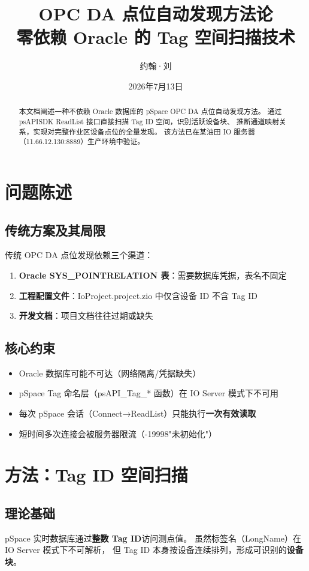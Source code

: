 \documentclass[12pt,a4paper]{ctexart}
\title{\textbf{OPC DA 点位自动发现方法论\\零依赖 Oracle 的 Tag 空间扫描技术}}
\author{约翰·刘}
\date{2026年7月13日}
\begin{document}
\maketitle
\begin{abstract}
本文档阐述一种不依赖 Oracle 数据库的 pSpace OPC DA 点位自动发现方法。
通过 psAPISDK ReadList 接口直接扫描 Tag ID 空间，识别活跃设备块、
推断通道映射关系，实现对完整作业区设备点位的全量发现。
该方法已在某油田 IO 服务器（11.66.12.130:8889）生产环境中验证。
\end{abstract}

\section{问题陈述}

\subsection{传统方案及其局限}
传统 OPC DA 点位发现依赖三个渠道：
\begin{enumerate}[leftmargin=*]
  \item \textbf{Oracle SYS\_POINTRELATION 表}：需要数据库凭据，表名不固定
  \item \textbf{工程配置文件}：IoProject.project.zio 中仅含设备 ID 不含 Tag ID
  \item \textbf{开发文档}：项目文档往往过期或缺失
\end{enumerate}

\subsection{核心约束}
\begin{itemize}[leftmargin=*]
  \item Oracle 数据库可能不可达（网络隔离/凭据缺失）
  \item pSpace Tag 命名层（psAPI\_Tag\_* 函数）在 IO Server 模式下不可用
  \item 每次 pSpace 会话（Connect→ReadList）只能执行\textbf{一次有效读取}
  \item 短时间多次连接会被服务器限流（-19998"未初始化"）
\end{itemize}

\section{方法：Tag ID 空间扫描}

\subsection{理论基础}
pSpace 实时数据库通过\textbf{整数 Tag ID}访问测点值。
虽然标签名（LongName）在 IO Server 模式下不可解析，
但 Tag ID 本身按设备连续排列，形成可识别的\textbf{设备块}。
\end{document}
